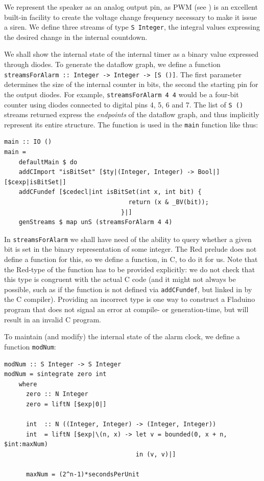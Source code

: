 \documentclass[a4paper, oneside, final]{memoir}
\let\Fref\undefined
\begin{document}
We represent the speaker as an analog output pin, as PWM (see
\Fref{sec:pwm}) is an excellent built-in facility to create the
voltage change frequency necessary to make it issue a siren.  We
define three streams of type \texttt{S Integer}, the integral values
expressing the desired change in the internal countdown.

We shall show the internal state of the internal timer as a binary
value expressed through diodes.  To generate the dataflow graph, we
define a function \texttt{streamsForAlarm :: Integer -> Integer -> [S
  ()]}.  The first parameter determines the size of the internal
counter in bits, the second the starting pin for the output diodes.
For example, \texttt{streamsForAlarm 4 4} would be a four-bit counter
using diodes connected to digital pins 4, 5, 6 and 7.  The list of
\texttt{S ()} streams returned express the \textit{endpoints} of the
dataflow graph, and thus implicitly represent its entire structure.
The function is used in the \texttt{main} function like thus:

\begin{verbatim}
main :: IO ()
main =
    defaultMain $ do
    addCImport "isBitSet" [$ty|(Integer, Integer) -> Bool|] [$cexp|isBitSet|]
    addCFundef [$cedecl|int isBitSet(int x, int bit) {
                                  return (x & _BV(bit));
                                }|]
    genStreams $ map unS (streamsForAlarm 4 4)
\end{verbatim}

In \texttt{streamsForAlarm} we shall have need of the ability to query
whether a given bit is set in the binary representation of some
integer.  The Red prelude does not define a function for this, so we
define a function, in C, to do it for us.  Note that the Red-type of
the function has to be provided explicitly: we do not check that this
type is congruent with the actual C code (and it might not always be
possible, such as if the function is not defined via
\texttt{addCFundef}, but linked in by the C compiler).  Providing an
incorrect type is one way to construct a Fladuino program that does
not signal an error at compile- or generation-time, but will result in
an invalid C program.

To maintain (and modify) the internal state of the alarm clock, we
define a function \texttt{modNum}:

\begin{verbatim}
modNum :: S Integer -> S Integer
modNum = sintegrate zero int
    where
      zero :: N Integer
      zero = liftN [$exp|0|]

      int  :: N ((Integer, Integer) -> (Integer, Integer))
      int  = liftN [$exp|\(n, x) -> let v = bounded(0, x + n, $int:maxNum)
                                    in (v, v)|]
      
      maxNum = (2^n-1)*secondsPerUnit
\end{verbatim}
\end{document}
